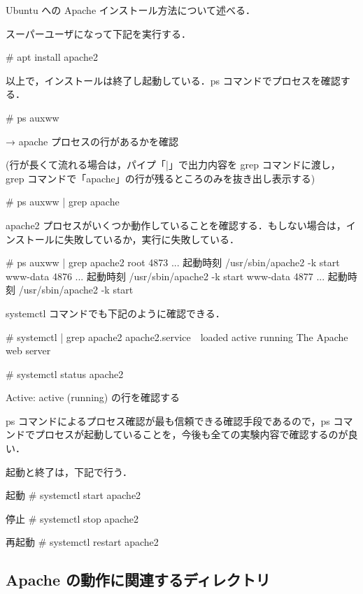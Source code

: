 Ubuntu への Apache インストール方法について述べる．

スーパーユーザになって下記を実行する．
\begin{cli}
# apt install apache2
\end{cli}

以上で，インストールは終了し起動している．ps コマンドでプロセスを確認する．
\begin{cli}
# ps auxww

 → apache プロセスの行があるかを確認

(行が長くて流れる場合は，パイプ「|」で出力内容を grep コマンドに渡し，
grep コマンドで「apache」の行が残るところのみを抜き出し表示する)

# ps auxww | grep apache

\end{cli}

apache2 プロセスがいくつか動作していることを確認する．もしない場合は，インストールに失敗しているか，実行に失敗している．

\begin{cli}
# ps auxww | grep apache2
root      4873  ...  起動時刻 /usr/sbin/apache2 -k start
www-data  4876  ...  起動時刻 /usr/sbin/apache2 -k start
www-data  4877  ...  起動時刻 /usr/sbin/apache2 -k start
\end{cli}

systemctl コマンドでも下記のように確認できる．

\begin{cli}
# systemctl | grep apache2
apache2.service　loaded active running  The Apache web server

# systemctl status apache2

Active: active (running) の行を確認する
\end{cli}

ps コマンドによるプロセス確認が最も信頼できる確認手段であるので，ps コマンドでプロセスが起動していることを，今後も全ての実験内容で確認するのが良い．

起動と終了は，下記で行う．

\begin{cli}
起動
# systemctl start apache2

停止
# systemctl stop apache2

再起動
# systemctl restart apache2
\end{cli}

\subsection{Apache の動作に関連するディレクトリ}

